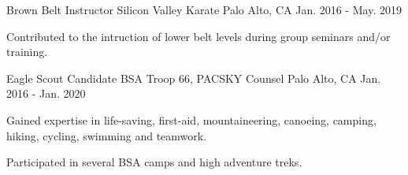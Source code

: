 

\begin{cventries}

  \cventry
    {Brown Belt Instructor} %
    {Silicon Valley Karate} %
    {Palo Alto, CA} %
    {Jan. 2016 - May. 2019} %
    {
      \begin{cvitems} %
        \item {Contributed to the intruction of lower belt levels during group
		seminars and/or training.}
      \end{cvitems}
    }

  \cventry
    {Eagle Scout Candidate} %
    {BSA Troop 66, PACSKY Counsel} %
    {Palo Alto, CA} %
    {Jan. 2016 - Jan. 2020} %
    {
      \begin{cvitems} %
        \item {Gained expertise in life-saving, first-aid, mountaineering,
		canoeing, camping, hiking, cycling, swimming and teamwork.}
        \item {Participated in several BSA camps and high adventure treks.}
      \end{cvitems}
    }

\end{cventries}

